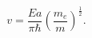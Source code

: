 \begin{equation}
v=\frac{Ea}{\pi\hbar}\left(\frac{m_e}{m}\right)^{\frac{1}{2}}.
\label{v1}
\end{equation}

